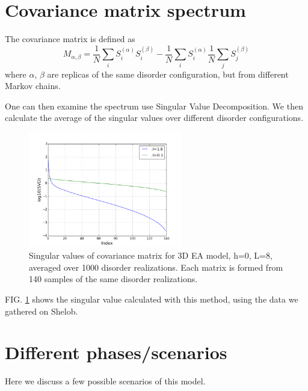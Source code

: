 \section{Covariance matrix spectrum}
The covariance matrix is defined as 
\[
M_{\alpha,\beta}=\frac{1}{N}\sum_iS_i^{(\alpha)}S_i^{(\beta)}-
\frac{1}{N}\sum_iS_i^{(\alpha)}\frac{1}{N}\sum_jS_j^{(\beta)}
\]
where $\alpha$, $\beta$ are replicas of the same disorder configuration, 
but from different Markov chains.

One can then examine the spectrum use Singular Value Decomposition. 
We then calculate the average of the singular values over different disorder 
configurations. 

\begin{figure}[ht]
  \centering
  \includegraphics[width=0.6\textwidth]{img/matrix/svd_data.png}
  \caption{Singular values of covariance matrix for 3D EA model, h=0, L=8, 
averaged over 1000 disorder realizations. 
Each matrix is formed from 140 samples of the same disorder realizations.}
  \label{fig:exp}
\end{figure}

FIG. \ref{fig:exp} shows the singular value calculated with this method, using
the data we gathered on Shelob.

\section{Different phases/scenarios}
Here we discuss a few possible scenarios of this model.

